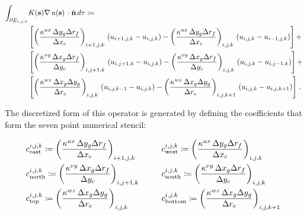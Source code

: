 \begin{linenomath*}\begin{equation}
    \begin{aligned}
        \int_{\partial E_{i,j,k}}
        &K(\mathbf{s})\nabla\,u(\mathbf{s})\,
        \cdot \hat{\mathbf{n}} \, d\mathbf{\tau}
        \coloneqq \\
        &\left[
            \left(
                \dfrac{\kappa^{ux} \, \Delta y_g \Delta r_f}{\Delta x_c}
            \right)_{i+1,j,k} \,
            (u_{i+1,j,k} - u_{i,j,k}) -
            \left(
                \dfrac{\kappa^{ux} \, \Delta y_g \Delta r_f}{\Delta x_c}
            \right)_{i,j,k} \,
            (u_{i,j,k} - u_{i-1,j,k})
        \right]+
        \\
        &\left[
            \left(
                \dfrac{\kappa^{vy} \, \Delta x_g \Delta r_f}{\Delta y_c}
            \right)_{i,j+1,k} \,
            (u_{i,j+1,k} - u_{i,j,k}) -
            \left(
                \dfrac{\kappa^{vy} \, \Delta x_g \Delta r_f}{\Delta y_c}
            \right)_{i,j,k} \,
            (u_{i,j,k} - u_{i,j-1,k})
        \right]+
        \\
        &\left[
            \left(
                \dfrac{\kappa^{wz} \, \Delta x_g \Delta y_g}{\Delta r_c}
            \right)_{i,j,k} \,
            (u_{i,j,k-1} - u_{i,j,k}) -
            \left(
                \dfrac{\kappa^{wz} \, \Delta x_g \Delta y_g}{\Delta r_c}
            \right)_{i,j,k+1} \,
            (u_{i,j,k} - u_{i,j,k+1})
        \right]
        \, .
    \end{aligned}
    \label{eq:big_laplacian}
\end{equation}\end{linenomath*}
The discretized form of this operator is generated by defining the coefficients
that form the seven point numerical stencil:
\begin{linenomath*}\begin{equation*}
    \begin{aligned}
        &c_\text{east}^{i,j,k} \coloneqq
            \left(
                \dfrac{\kappa^{ux} \, \Delta y_g \Delta r_f}{\Delta x_c}
            \right)_{i+1,j,k} \,
        \qquad
        &&c_\text{west}^{i,j,k} \coloneqq
            \left(
                \dfrac{\kappa^{ux} \, \Delta y_g \Delta r_f}{\Delta x_c}
            \right)_{i,j,k} \,
        \\
        &c_\text{north}^{i,j,k} \coloneqq
            \left(
                \dfrac{\kappa^{vy} \, \Delta x_g \Delta r_f}{\Delta y_c}
            \right)_{i,j+1,k} \,
        &&c_\text{south}^{i,j,k} \coloneqq
            \left(
                \dfrac{\kappa^{vy} \, \Delta x_g \Delta r_f}{\Delta y_c}
            \right)_{i,j,k} \,
        \\
        &c_\text{top}^{i,j,k} \coloneqq
            \left(
                \dfrac{\kappa^{wz} \, \Delta x_g \Delta y_g}{\Delta r_c}
            \right)_{i,j,k} \,
        &&c_\text{bottom}^{i,j,k} \coloneqq
            \left(
                \dfrac{\kappa^{wz} \, \Delta x_g \Delta y_g}{\Delta r_c}
            \right)_{i,j,k+1} \,
    \end{aligned}
\end{equation*}\end{linenomath*}
